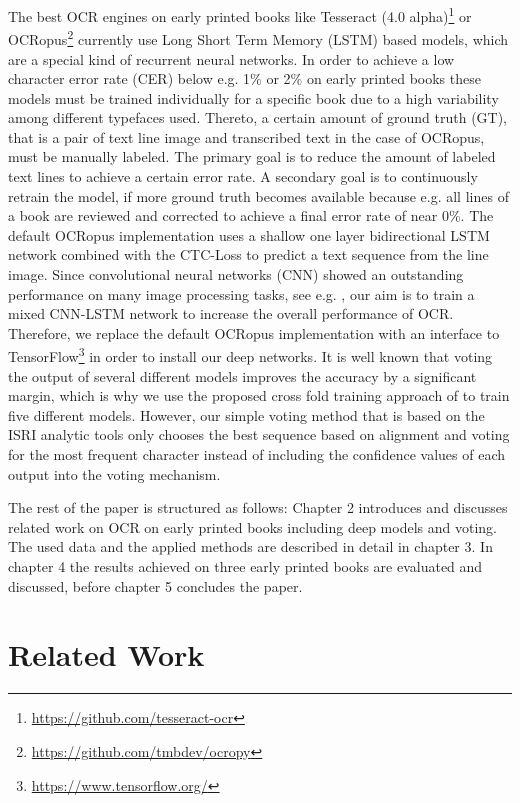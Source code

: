 \documentclass{jlcl}
\begin{document}
The best OCR engines on early printed books like Tesseract (4.0 alpha)\footnote{\url{https://github.com/tesseract-ocr}} or OCRopus\footnote{\url{https://github.com/tmbdev/ocropy}} currently use Long Short Term Memory (LSTM) based models, which are a special kind of recurrent neural networks.
In order to achieve a low character error rate (CER) below e.g. 1\% or 2\% on early printed books these models must be trained individually for a specific book due to a high variability among different typefaces used.
Thereto, a certain amount of ground truth (GT), that is a pair of text line image and transcribed text in the case of OCRopus, must be manually labeled. The primary goal is to reduce the amount of labeled text lines to achieve a certain error rate.
A secondary goal is to continuously retrain the model, if more ground truth becomes available because e.g. all lines of a book are reviewed and corrected to achieve a final error rate of near 0\%. 
The default OCRopus implementation uses a shallow one layer bidirectional LSTM network combined with the CTC-Loss to predict a text sequence from the line image.
Since convolutional neural networks (CNN) showed an outstanding performance on many image processing tasks, see e.g. \cite{mane2017surveycnn}, our aim is to train a mixed CNN-LSTM network to increase the overall performance of OCR.
Therefore, we replace the default OCRopus implementation with an interface to TensorFlow\footnote{\url{https://www.tensorflow.org/}} in order to install our deep networks.
It is well known that voting the output of several different models improves the accuracy by a significant margin, which is why we use the proposed cross fold training approach of \cite{reul2017voting} to train five different models.
However, our simple voting method that is based on the ISRI analytic tools \citep{rice1996isri} only chooses the best sequence based on alignment and voting for the most frequent character instead of including the confidence values of each output into the voting mechanism.

The rest of the paper is structured as follows: Chapter 2 introduces and discusses related work on OCR on early printed books including deep models and voting.
The used data and the applied methods are described in detail in chapter 3.
In chapter 4 the results achieved on three early printed books are evaluated and discussed, before chapter 5 concludes the paper.

\section{Related Work}
\end{document}
